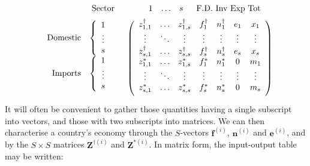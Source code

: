 \documentclass{article}
\begin{document}
\begin{equation}\label{eqn:T}
\begin{array}{rc}
\begin{array}{cc} & \mbox{Sector} \end{array} 
& 
\begin{array}{cccc} \hspace*{4mm}1 & \mathellipsis & s & \hspace*{2mm} \mbox{F.D. Inv Exp Tot} \end{array} \vspace*{2mm} \\
\begin{array}{r}
\begin{array}{rc}
\mbox{Domestic} & \left\{ \begin{array}{c}
1 \\
\vdots \\
s
\end{array} \right. \\
\mbox{Imports} & \left\{ \begin{array}{c}
1 \\
\vdots \\
s \\
\end{array} \right.
\end{array} \vspace*{2mm} \\
\end{array} &
\left( \begin{array}{ccccccc}
z^{\dag}_{1,1} & \mathellipsis & z^{\dag}_{1,s} & f^\dag_{1} & n^\dag_{1} & e_{1} & x_1 \\
\vdots & \ddots & \vdots & \vdots & \vdots & \vdots & \vdots \\
z^{\dag}_{s,1} & \mathellipsis & z^{\dag}_{s,s} & f^\dag_{s} & n^\dag_{s} & e_{s} & x_{s} \\
z^*_{1,1} & \mathellipsis & z^*_{1,s} & f^*_{1} & n^*_{1} & 0 & m_1 \\
\vdots & \ddots & \vdots & \vdots & \vdots & \vdots & \vdots \\
z^*_{s,1} & \mathellipsis & z^*_{s,s} & f^*_{s} & n^*_{s} & 0 & m_{s} \vspace*{2mm} \\
\end{array} \right)
\end{array}
\end{equation}
It will often be convenient to gather those quantities having a single subscript into vectors, and those with two subscripts into matrices. 
We can then characterise a country's economy through the $S$-vectors $\boldsymbol{f}^{(i)}$, $\boldsymbol{n}^{(i)}$ and $\boldsymbol{e}^{(i)}$, and by the $S\times S$ matrices $\boldsymbol{Z}^{\dagger(i)}$ and $\boldsymbol{Z}^{*(i)}$.
In matrix form, the input-output table may be written:
\end{document}
